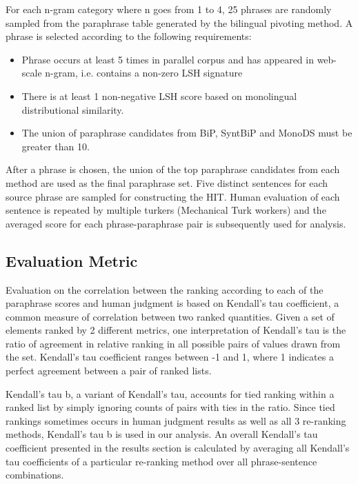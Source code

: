 \documentclass[11pt]{article}
\begin{document}
For each n-gram category where n goes from 1 to 4, 25 phrases are randomly sampled from the paraphrase table generated by the bilingual pivoting method. A phrase is selected according to the following requirements:

\begin{itemize}
\item Phrase occurs at least 5 times in parallel corpus and has appeared in web-scale n-gram, i.e. contains a non-zero LSH signature
\item There is at least 1 non-negative LSH score based on monolingual distributional similarity.
\item The union of paraphrase candidates from BiP, SyntBiP and MonoDS must be greater than 10.
\end{itemize}

After a phrase is chosen, the union of the top paraphrase candidates from each method are used as the final paraphrase set. Five distinct sentences for each source phrase are sampled for constructing the HIT. Human evaluation of each sentence is repeated by multiple turkers (Mechanical Turk workers) and the averaged score for each phrase-paraphrase pair is subsequently used for analysis.

\subsection{Evaluation Metric}
Evaluation on the correlation between the ranking according to each of the paraphrase scores and human judgment is based on Kendall's tau coefficient, a common measure of correlation between two ranked quantities. Given a set of elements ranked by 2 different metrics, one interpretation of Kendall's tau is the ratio of agreement in relative ranking in all possible pairs of values drawn from the set. Kendall's tau coefficient ranges between -1 and 1, where 1 indicates a perfect agreement between a pair of ranked lists. 

Kendall's tau b, a variant of Kendall's tau, accounts for tied ranking within a ranked list by simply ignoring counts of pairs with ties in the ratio. Since tied rankings sometimes occurs in human judgment results as well as all 3 re-ranking methods, Kendall's tau b is used in our analysis. An overall Kendall's tau coefficient presented in the results section is calculated by averaging all Kendall's tau coefficients of a particular re-ranking method over all phrase-sentence combinations.
\end{document}
